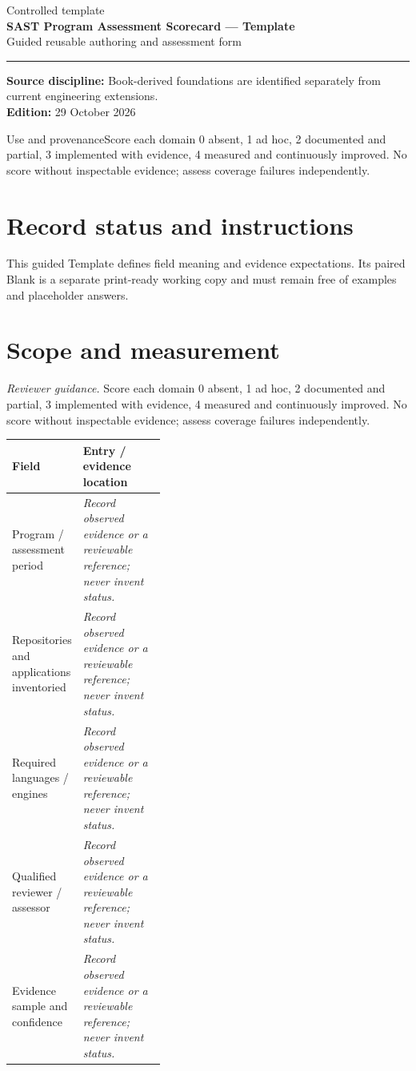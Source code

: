 \documentclass[10pt,letterpaper]{article}
\begin{document}
\hypersetup{pageanchor=false}%
\begin{titlepage}
\vspace*{1.0in}
{\color{bluegray}\Large Controlled template}\\[1.0em]
{\color{navy}\Huge\bfseries SAST Program Assessment Scorecard --- Template}\\[0.7em]
{\Large Guided reusable authoring and assessment form}\\[2.0em]
\rule{\linewidth}{1.0pt}
\vfill
\textbf{Source discipline:} Book-derived foundations are identified separately from current engineering extensions.\\
\textbf{Edition:} 29 October 2026
\end{titlepage}\hypersetup{pageanchor=true}
\tableofcontents
\clearpage
\begin{focusbox}{Use and provenance}Score each domain 0 absent, 1 ad hoc, 2 documented and partial, 3 implemented with evidence, 4 measured and continuously improved. No score without inspectable evidence; assess coverage failures independently.\end{focusbox}
\section{Record status and instructions}
This guided Template defines field meaning and evidence expectations. Its paired Blank is a separate print-ready working copy and must remain free of examples and placeholder answers.

\section{Scope and measurement}
\textit{Reviewer guidance.} Score each domain 0 absent, 1 ad hoc, 2 documented and partial, 3 implemented with evidence, 4 measured and continuously improved. No score without inspectable evidence; assess coverage failures independently.
\begin{tabularx}{\linewidth}{@{}p{0.38\linewidth}Y@{}}
\toprule Field & Entry / evidence location\\\midrule
Program / assessment period & \textit{Record observed evidence or a reviewable reference; never invent status.}\\[1.0em]
\midrule
Repositories and applications inventoried & \textit{Record observed evidence or a reviewable reference; never invent status.}\\[1.0em]
\midrule
Required languages / engines & \textit{Record observed evidence or a reviewable reference; never invent status.}\\[1.0em]
\midrule
Qualified reviewer / assessor & \textit{Record observed evidence or a reviewable reference; never invent status.}\\[1.0em]
\midrule
Evidence sample and confidence & \textit{Record observed evidence or a reviewable reference; never invent status.}\\[1.0em]
\midrule
\end{tabularx}
\end{document}

